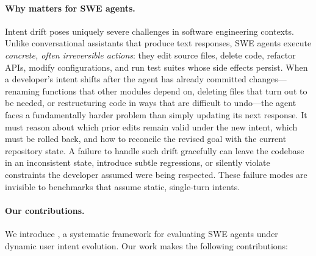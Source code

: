 \paragraph{Why \drift{} matters for SWE agents.}
Intent drift poses uniquely severe challenges in software engineering contexts. Unlike conversational assistants that produce text responses, SWE agents execute \emph{concrete, often irreversible actions}: they edit source files, delete code, refactor APIs, modify configurations, and run test suites whose side effects persist. When a developer's intent shifts after the agent has already committed changes---renaming functions that other modules depend on, deleting files that turn out to be needed, or restructuring code in ways that are difficult to undo---the agent faces a fundamentally harder problem than simply updating its next response. It must reason about which prior edits remain valid under the new intent, which must be rolled back, and how to reconcile the revised goal with the current repository state. A failure to handle such drift gracefully can leave the codebase in an inconsistent state, introduce subtle regressions, or silently violate constraints the developer assumed were being respected. These failure modes are invisible to benchmarks that assume static, single-turn intents.

\paragraph{Our contributions.}
We introduce \textbf{\drift{}}, a systematic framework for evaluating SWE agents under dynamic user intent evolution. Our work makes the following contributions:

